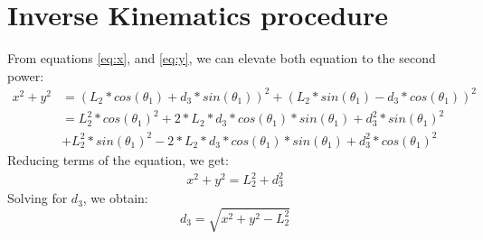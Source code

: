 \documentclass[12pt]{article}
\begin{document}
    \section{Inverse Kinematics procedure}
    From equations \ref{eq:x}, and \ref{eq:y}, we can elevate both equation to the second power:
    \begin{equation}
        \begin{split}
        x^2 + y^2 & = (L_2 * cos(\theta_1) + d_3 * sin(\theta_1))^2 + (L_2 * sin(\theta_1) - d_3 * cos(\theta_1))^2 \nonumber \nonumber \\
	     & = L_2^2 * cos(\theta_1)^2 + 2*L_2*d_3*cos(\theta_1)*sin(\theta_1) + d_3^2 * sin(\theta_1)^2 \nonumber \\
        & + L_2^2 * sin(\theta_1)^2 - 2*L_2*d_3*cos(\theta_1)*sin(\theta_1) + d_3^2 * cos(\theta_1)^2 \nonumber
        \end{split}
    \end{equation}
    Reducing terms of the equation, we get:
    \begin{equation} 
        \begin{split}
	        x^2 + y^2 = L_2^2 + d_3^2 \nonumber
        \end{split}
    \end{equation}
    Solving for $d_3$, we obtain:
    \begin{equation}
        d_3 = \sqrt{x^2 + y^2 - L_2^2}
    \end{equation}
    
\end{document}
